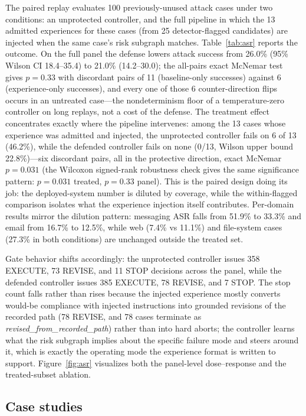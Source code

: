 The paired replay evaluates 100 previously-unused attack cases under two conditions: an unprotected controller, and the full pipeline in which the 13 admitted experiences for these cases (from 25 detector-flagged candidates) are injected when the same case's risk subgraph matches. Table~\ref{tab:asr} reports the outcome. On the full panel the defense lowers attack success from 26.0\% (95\% Wilson CI 18.4--35.4) to 21.0\% (14.2--30.0); the all-pairs exact McNemar test gives $p=0.33$ with discordant pairs of 11 (baseline-only successes) against 6 (experience-only successes), and every one of those 6 counter-direction flips occurs in an untreated case---the nondeterminism floor of a temperature-zero controller on long replays, not a cost of the defense. The treatment effect concentrates exactly where the pipeline intervenes: among the 13 cases whose experience was admitted and injected, the unprotected controller fails on 6 of 13 (46.2\%), while the defended controller fails on none (0/13, Wilson upper bound 22.8\%)---six discordant pairs, all in the protective direction, exact McNemar $p=0.031$ (the Wilcoxon signed-rank robustness check gives the same significance pattern: $p=0.031$ treated, $p=0.33$ panel). This is the paired design doing its job: the deployed-system number is diluted by coverage, while the within-flagged comparison isolates what the experience injection itself contributes. Per-domain results mirror the dilution pattern: messaging ASR falls from 51.9\% to 33.3\% and email from 16.7\% to 12.5\%, while web (7.4\% vs 11.1\%) and file-system cases (27.3\% in both conditions) are unchanged outside the treated set.

Gate behavior shifts accordingly: the unprotected controller issues 358 EXECUTE, 73 REVISE, and 11 STOP decisions across the panel, while the defended controller issues 385 EXECUTE, 78 REVISE, and 7 STOP. The stop count falls rather than rises because the injected experience mostly converts would-be compliance with injected instructions into grounded revisions of the recorded path (78 REVISE, and 78 cases terminate as \emph{revised\_from\_recorded\_path}) rather than into hard aborts; the controller learns what the risk subgraph implies about the specific failure mode and steers around it, which is exactly the operating mode the experience format is written to support. Figure~\ref{fig:asr} visualizes both the panel-level dose--response and the treated-subset ablation.

\subsection{Case studies}
\label{sec:results-cases}

